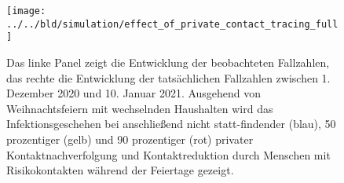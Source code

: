 \documentclass[a4paper,11pt,leqno,fleqn]{article}
\begin{document}
\begin{figure}
\label{fig:effect_of_contact_tracing_with_full_christmas}
\texttt{[image: ../../bld/simulation/effect\_of\_private\_contact\_tracing\_full]}
\caption{
    Das linke Panel zeigt die Entwicklung der beobachteten Fallzahlen, das rechte die Entwicklung der tatsächlichen Fallzahlen zwischen 1. Dezember 2020 und 10. Januar 2021. Ausgehend von Weihnachtsfeiern mit wechselnden Haushalten wird das Infektionsgeschehen bei anschließend nicht statt-findender (blau), 50 prozentiger (gelb) und 90 prozentiger (rot)
    privater Kontaktnachverfolgung und Kontaktreduktion durch Menschen mit Risikokontakten
    während der Feiertage gezeigt.
}
\end{figure}
\end{document}

